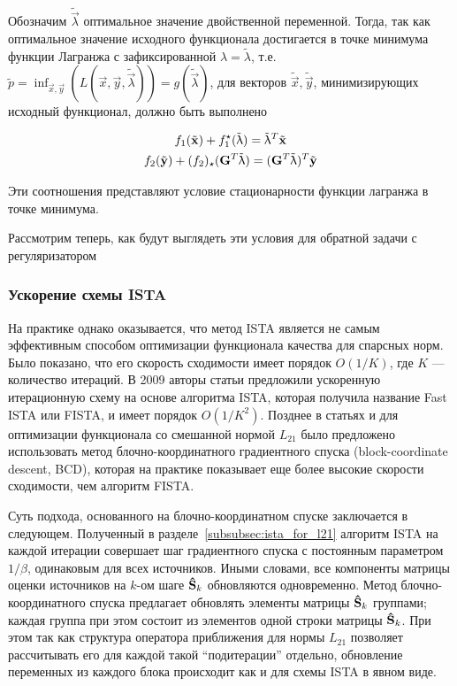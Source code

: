 Обозначим
$\tilde{\vec{\lambda}}$ оптимальное значение двойственной переменной. Тогда,
так как оптимальное значение исходного функционала достигается в точке минимума
функции Лагранжа с зафиксированной $\lambda = \tilde{\lambda}$, т.е.
$ \tilde{p} = \inf_{\vec{x}, \vec{y}}(L(\vec{x}, \vec{y}, \tilde{\vec{\lambda}})) =
g(\tilde{\vec{\lambda}})$, для векторов $\tilde{\vec{x}},
\tilde{\vec{y}}$, минимизирующих исходный функционал, должно быть выполнено

\begin{gather}
    f_1(\tilde{\mathbf{x}}) + f_1^{\star}(\tilde{\mathbf{\uplambda}}) = \tilde{\mathbf{\uplambda}}^T\tilde{\mathbf{x}}\\
    f_2(\tilde{\mathbf{y}}) + (f_2)_{\star}(\mathbf{G}^T\tilde{\mathbf{\uplambda}}) = (\mathbf{G}^T\tilde{\mathbf{\uplambda}})^T\tilde{\mathbf{y}}
    \label{eq:dual_kkt_conditions}
\end{gather}

Эти соотношения представляют условие стационарности функции лагранжа в точке минимума.

Рассмотрим теперь, как будут выглядеть эти условия для обратной задачи с регуляризатором


\subsubsection{Ускорение схемы ISTA} 

На практике однако оказывается, что метод
ISTA является не самым эффективным способом оптимизации функционала качества
для спарсных норм. Было показано, что его скорость сходимости имеет порядок
$O(1/K)$, где $K$ --- количество итераций. В 2009 авторы статьи
\cite{beck_trebulle_2009} предложили ускоренную итерационную схему на основе
алгоритма ISTA, которая получила название Fast ISTA или FISTA, и имеет порядок
$O(1/K^2)$. Позднее в статьях \cite{rakotomamonjy_2011} и \cite{qin_2013} для
оптимизации функционала со смешанной нормой $L_{21}$ было предложено
использовать метод блочно-координатного градиентного спуска (block-coordinate
descent, BCD), которая на практике показывает еще более высокие скорости сходимости,
чем алгоритм FISTA.

Суть подхода, основанного на блочно-координатном спуске заключается в следующем.
Полученный в разделе~\ref{subsubsec:ista_for_l21} алгоритм ISTA на каждой
итерации совершает шаг градиентного спуска с постоянным параметром $1/\beta$,
одинаковым для всех источников. Иными словами, все компоненты матрицы 
оценки источников на $k$-ом шаге $\mathbf{\hat{S}}_k$ обновляются одновременно.
Метод блочно-координатного спуска предлагает обновлять элементы матрицы $\mathbf{\hat{S}}_k$
группами; каждая группа при этом состоит из элементов одной строки матрицы $\mathbf{\hat{S}}_k$.
При этом так как структура оператора приближения для нормы $L_{21}$ позволяет
рассчитывать его для каждой такой ``подитерации'' отдельно, обновление переменных из
каждого блока происходит как и для схемы ISTA в явном виде.
